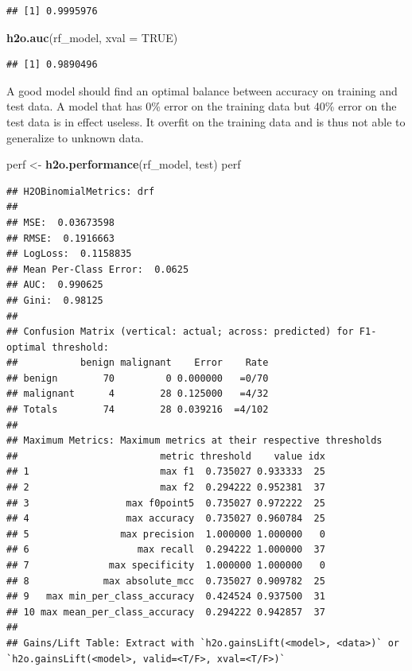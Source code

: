 \documentclass[]{article}
\newenvironment{Shaded}{\begin{snugshade}}{\end{snugshade}}
\newcommand{\KeywordTok}[1]{\textcolor[rgb]{0.13,0.29,0.53}{\textbf{{#1}}}}
\newcommand{\DataTypeTok}[1]{\textcolor[rgb]{0.13,0.29,0.53}{{#1}}}
\newcommand{\StringTok}[1]{\textcolor[rgb]{0.31,0.60,0.02}{{#1}}}
\newcommand{\OtherTok}[1]{\textcolor[rgb]{0.56,0.35,0.01}{{#1}}}
\newcommand{\NormalTok}[1]{{#1}}
\begin{document}
\begin{verbatim}
## [1] 0.9995976
\end{verbatim}

\begin{Shaded}
\begin{Highlighting}[]
\KeywordTok{h2o.auc}\NormalTok{(rf_model, }\DataTypeTok{xval =} \OtherTok{TRUE}\NormalTok{)}
\end{Highlighting}
\end{Shaded}

\begin{verbatim}
## [1] 0.9890496
\end{verbatim}

A good model should find an optimal balance between accuracy on training
and test data. A model that has 0\% error on the training data but 40\%
error on the test data is in effect useless. It overfit on the training
data and is thus not able to generalize to unknown data.

\begin{Shaded}
\begin{Highlighting}[]
\NormalTok{perf <-}\StringTok{ }\KeywordTok{h2o.performance}\NormalTok{(rf_model, test)}
\NormalTok{perf}
\end{Highlighting}
\end{Shaded}

\begin{verbatim}
## H2OBinomialMetrics: drf
## 
## MSE:  0.03673598
## RMSE:  0.1916663
## LogLoss:  0.1158835
## Mean Per-Class Error:  0.0625
## AUC:  0.990625
## Gini:  0.98125
## 
## Confusion Matrix (vertical: actual; across: predicted) for F1-optimal threshold:
##           benign malignant    Error    Rate
## benign        70         0 0.000000   =0/70
## malignant      4        28 0.125000   =4/32
## Totals        74        28 0.039216  =4/102
## 
## Maximum Metrics: Maximum metrics at their respective thresholds
##                         metric threshold    value idx
## 1                       max f1  0.735027 0.933333  25
## 2                       max f2  0.294222 0.952381  37
## 3                 max f0point5  0.735027 0.972222  25
## 4                 max accuracy  0.735027 0.960784  25
## 5                max precision  1.000000 1.000000   0
## 6                   max recall  0.294222 1.000000  37
## 7              max specificity  1.000000 1.000000   0
## 8             max absolute_mcc  0.735027 0.909782  25
## 9   max min_per_class_accuracy  0.424524 0.937500  31
## 10 max mean_per_class_accuracy  0.294222 0.942857  37
## 
## Gains/Lift Table: Extract with `h2o.gainsLift(<model>, <data>)` or `h2o.gainsLift(<model>, valid=<T/F>, xval=<T/F>)`
\end{verbatim}
\end{document}
